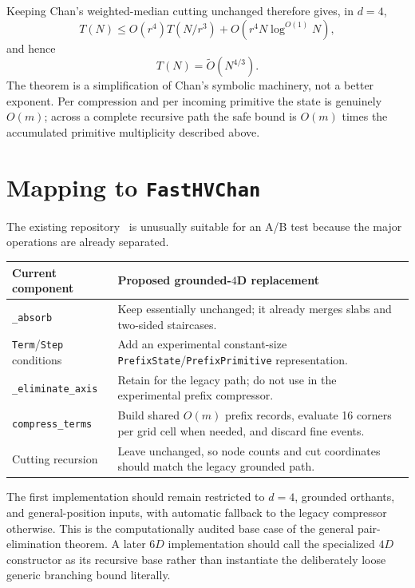 \documentclass[12pt,a4paper]{article}
\theoremstyle{definition}
\newcommand{\1}{\mathbf 1}
\begin{document}
Keeping Chan's weighted-median cutting unchanged therefore gives, in $d=4$,
\begin{equation}
T(N)\le O(r^4)T(N/r^3)+O(r^4N\log^{O(1)}N),                   \label{eq:newrec}
\end{equation}
and hence
\begin{equation}
\boxed{T(N)=\widetilde O(N^{4/3}).}                            \label{eq:newtime}
\end{equation}
The theorem is a simplification of Chan's symbolic machinery, not a better exponent.  Per compression and per incoming primitive the state is genuinely $O(m)$; across a complete recursive path the safe bound is $O(m)$ times the accumulated primitive multiplicity described above.

\section{Mapping to \texttt{FastHVChan}}

The existing repository~\cite{FastHVChan} is unusually suitable for an A/B test because the major operations are already separated.

\begin{center}
\begin{tabular}{>{\raggedright\arraybackslash}p{} >{\raggedright\arraybackslash}p{}}
\toprule
Current component & Proposed grounded-$4$D replacement \\
\midrule
\texttt{\_absorb} & Keep essentially unchanged; it already merges slabs and two-sided staircases. \\
\texttt{Term}/\texttt{Step} conditions & Add an experimental constant-size \texttt{PrefixState}/\texttt{PrefixPrimitive} representation. \\
\texttt{\_eliminate\_axis} & Retain for the legacy path; do not use in the experimental prefix compressor. \\
\texttt{compress\_terms} & Build shared $O(m)$ prefix records, evaluate 16 corners per grid cell when needed, and discard fine events. \\
Cutting recursion & Leave unchanged, so node counts and cut coordinates should match the legacy grounded path. \\
\bottomrule
\end{tabular}
\end{center}

The first implementation should remain restricted to $d=4$, grounded orthants, and general-position inputs, with automatic fallback to the legacy compressor otherwise.  This is the computationally audited base case of the general pair-elimination theorem.  A later $6D$ implementation should call the specialized $4D$ constructor as its recursive base rather than instantiate the deliberately loose generic branching bound literally.
\end{document}
